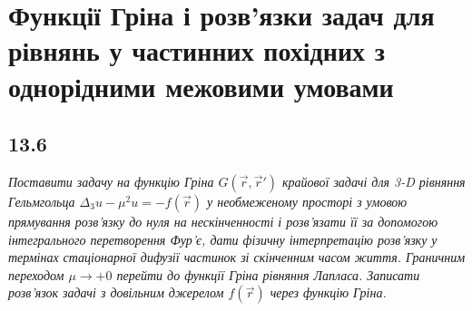 \documentclass[a4paper, 14pt]{extreport}
\begin{document}
\chapter{Функції Гріна і розв’язки задач для рівнянь у частинних похідних з однорідними межовими умовами}

\section[Задача №13.6]{13.6}

\textit{Поставити задачу на функцію Гріна $G(\vec{r},\vec{r}')$ крайової задачі для 3-D рівняння Гельмгольца $\Delta_3 u - \mu^2 u = -f(\vec{r})$ у необмеженому просторі з умовою прямування розв’язку до нуля на нескінченності і розв’язати її за допомогою інтегрального перетворення Фур’є, дати фізичну інтерпретацію розв’язку у термінах стаціонарної дифузії частинок зі скінченним часом життя. Граничним переходом $\mu \to +0$ перейти до функції Гріна рівняння Лапласа. Записати розв’язок задачі з довільним джерелом $f(\vec{r})$ через функцію Гріна.}
\end{document}
